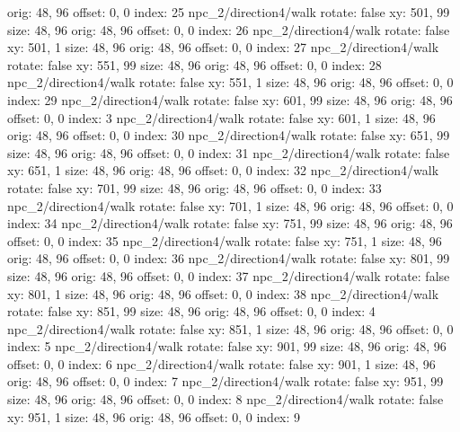   orig: 48, 96
  offset: 0, 0
  index: 25
npc_2/direction4/walk
  rotate: false
  xy: 501, 99
  size: 48, 96
  orig: 48, 96
  offset: 0, 0
  index: 26
npc_2/direction4/walk
  rotate: false
  xy: 501, 1
  size: 48, 96
  orig: 48, 96
  offset: 0, 0
  index: 27
npc_2/direction4/walk
  rotate: false
  xy: 551, 99
  size: 48, 96
  orig: 48, 96
  offset: 0, 0
  index: 28
npc_2/direction4/walk
  rotate: false
  xy: 551, 1
  size: 48, 96
  orig: 48, 96
  offset: 0, 0
  index: 29
npc_2/direction4/walk
  rotate: false
  xy: 601, 99
  size: 48, 96
  orig: 48, 96
  offset: 0, 0
  index: 3
npc_2/direction4/walk
  rotate: false
  xy: 601, 1
  size: 48, 96
  orig: 48, 96
  offset: 0, 0
  index: 30
npc_2/direction4/walk
  rotate: false
  xy: 651, 99
  size: 48, 96
  orig: 48, 96
  offset: 0, 0
  index: 31
npc_2/direction4/walk
  rotate: false
  xy: 651, 1
  size: 48, 96
  orig: 48, 96
  offset: 0, 0
  index: 32
npc_2/direction4/walk
  rotate: false
  xy: 701, 99
  size: 48, 96
  orig: 48, 96
  offset: 0, 0
  index: 33
npc_2/direction4/walk
  rotate: false
  xy: 701, 1
  size: 48, 96
  orig: 48, 96
  offset: 0, 0
  index: 34
npc_2/direction4/walk
  rotate: false
  xy: 751, 99
  size: 48, 96
  orig: 48, 96
  offset: 0, 0
  index: 35
npc_2/direction4/walk
  rotate: false
  xy: 751, 1
  size: 48, 96
  orig: 48, 96
  offset: 0, 0
  index: 36
npc_2/direction4/walk
  rotate: false
  xy: 801, 99
  size: 48, 96
  orig: 48, 96
  offset: 0, 0
  index: 37
npc_2/direction4/walk
  rotate: false
  xy: 801, 1
  size: 48, 96
  orig: 48, 96
  offset: 0, 0
  index: 38
npc_2/direction4/walk
  rotate: false
  xy: 851, 99
  size: 48, 96
  orig: 48, 96
  offset: 0, 0
  index: 4
npc_2/direction4/walk
  rotate: false
  xy: 851, 1
  size: 48, 96
  orig: 48, 96
  offset: 0, 0
  index: 5
npc_2/direction4/walk
  rotate: false
  xy: 901, 99
  size: 48, 96
  orig: 48, 96
  offset: 0, 0
  index: 6
npc_2/direction4/walk
  rotate: false
  xy: 901, 1
  size: 48, 96
  orig: 48, 96
  offset: 0, 0
  index: 7
npc_2/direction4/walk
  rotate: false
  xy: 951, 99
  size: 48, 96
  orig: 48, 96
  offset: 0, 0
  index: 8
npc_2/direction4/walk
  rotate: false
  xy: 951, 1
  size: 48, 96
  orig: 48, 96
  offset: 0, 0
  index: 9

